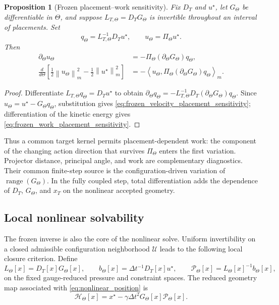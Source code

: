 \documentclass[11pt]{article}
\theoremstyle{plain}
\newtheorem{proposition}[theorem]{Proposition}
\theoremstyle{definition}
\theoremstyle{remark}
\newcommand{\range}{\operatorname{range}}
\newcommand{\dt}{\Delta t}
\newcommand{\Th}{\Theta}
\newcommand{\half}{\tfrac12}
\newcommand{\norm}[2][]{\left\lVert #2\right\rVert_{#1}}
\newcommand{\ip}[3][]{\left\langle #2,#3\right\rangle_{#1}}
\begin{document}
\begin{proposition}[Frozen placement--work sensitivity]
\label{prop:frozen_placement_work_sensitivity}
Fix $D_T$ and $u^\star$, let $G_\Th$ be differentiable in $\Th$, and suppose
$L_{T,\Th}=D_TG_\Th$ is invertible throughout an interval of placements.  Set
\begin{equation}
 q_\Th=L_{T,\Th}^{-1}D_Tu^\star,
 \qquad
 u_\Th=\Pi_\Th u^\star.
 \label{eq:frozen_placement_pressure_and_velocity}
\end{equation}
Then
\begin{align}
 \partial_\Th u_\Th
 &=-\Pi_\Th(\partial_\Th G_\Th)q_\Th,
 \label{eq:frozen_velocity_placement_sensitivity}\\
 \frac{d}{d\Th}\!\left[
  \half\norm[m]{u_\Th}^2-
  \half\norm[m]{u^\star}^2\right]
 &=-\ip[m]{u_\Th}
 {\Pi_\Th(\partial_\Th G_\Th)q_\Th}.
 \label{eq:frozen_work_placement_sensitivity}
\end{align}
\end{proposition}

\begin{proof}
Differentiate $L_{T,\Th}q_\Th=D_Tu^\star$ to obtain
$\partial_\Th q_\Th=-L_{T,\Th}^{-1}D_T
(\partial_\Th G_\Th)q_\Th$.  Since
$u_\Th=u^\star-G_\Th q_\Th$, substitution gives
\eqref{eq:frozen_velocity_placement_sensitivity}; differentiation of the
kinetic energy gives \eqref{eq:frozen_work_placement_sensitivity}.
\end{proof}

Thus a common target kernel permits placement-dependent work: the component of
the changing action direction that survives $\Pi_\Th$ enters the first
variation.  Projector distance, principal angle, and work are complementary
diagnostics.  Their common finite-step source is the configuration-driven
variation of $\range(G_\Th)$.  In the fully coupled step, total differentiation
adds the dependence of $D_T$, $G_\Th$, and $x_T$ on the nonlinear accepted
geometry.

\subsection{Local nonlinear solvability}
\label{sec:conditional_coupled_solvability}

The frozen inverse is also the core of the nonlinear solve.  Uniform
invertibility on a closed admissible configuration neighborhood $\mathcal U$
leads to the following local closure criterion.  Define
\begin{equation}
 L_\Th[x]=D_T[x]G_\Th[x],
 \qquad
 b_\Th[x]=\dt^{-1}D_T[x]u^\star,
 \qquad
 \mathcal P_\Th[x]=L_\Th[x]^{-1}b_\Th[x],
 \label{eq:nonlinear_frozen_solution_map}
\end{equation}
on the fixed gauge-reduced pressure and constraint spaces.  The reduced
geometry map associated with \eqref{eq:nonlinear_position} is
\begin{equation}
 \mathcal H_\Th[x]
 =x^\star-\gamma\dt^2G_\Th[x]\mathcal P_\Th[x].
 \label{eq:nonlinear_reduced_geometry_map}
\end{equation}
\end{document}
